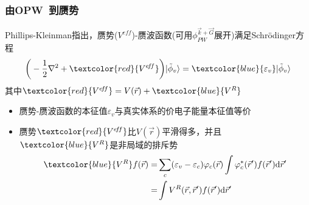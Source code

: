 {\frame
{
	\frametitle{由\textrm{OPW~}到赝势}
	\textrm{Phillips-Kleinman}指出，赝势($V^{e\!f\!f}$)-赝波函数(可用$\phi_{PW}^{\vec k+\vec G}$展开)满足\textrm{Schr\"odinger}方程%
	$$\bigg(-\dfrac12\nabla^2+\textcolor{red}{V^{e\!f\!f}}\bigg)|\tilde{\phi}_v\rangle=\textcolor{blue}{\varepsilon_v}|\tilde{\phi}_v\rangle$$
	其中$\textcolor{red}{V^{e\!f\!f}}=V(\vec r)+\textcolor{blue}{V^R}$
	\begin{itemize}
		\item 赝势-赝波函数的本征值$\varepsilon_v$与真实体系的价电子能量本征值等价
		\item 赝势$\textcolor{red}{V^{e\!f\!f}}$比$V(\vec r)$平滑得多，并且$\textcolor{blue}{V^R}$是非局域的排斥势
			\begin{displaymath}
				\begin{aligned}
					\textcolor{blue}{V^R}f(\vec r)=&\sum_c(\varepsilon_v-\varepsilon_c)\varphi_c(\vec r)\int\varphi_c^{\ast}(\vec r^{\prime})f(\vec r^{\prime})\mathrm{d}\vec r^{\prime} \\
					=&\int V^R(\vec r,\vec r^{\prime})f(\vec r^{\prime})\mathrm{d}\vec r^{\prime}
				\end{aligned}
			\end{displaymath}
	\end{itemize}
}

}
